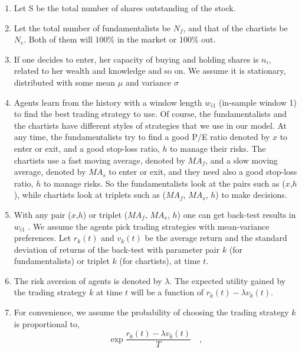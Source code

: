 \begin{enumerate}
\item {Let S be the total number of shares outstanding of the stock.}

\item {Let the total number of fundamentalists be $N_f$, and that of the chartists be $N_c$. Both of them will 100\% in the market or 100\% out.}

\item {If one decides to enter, her capacity of buying and holding shares is $n_i$, related to her wealth and knowledge and so on. We assume it is stationary, distributed with some mean $\mu$ and variance $\sigma$}

\item {Agents learn from the history with a window length $w_{i1}$ (in-sample window 1) to find the best trading strategy to use. Of course, the fundamentalists and the chartists have different styles of strategies that we use in our model.
At any time, the fundamentalists try to find a good P/E ratio denoted by $x$ to enter or exit, and a good stop-loss ratio, $h$ to manage their risks. The chartists use a fast moving average, denoted by $MA_f$, and a slow moving average, denoted by $MA_s$ to enter or exit, and they need also a good stop-loss ratio, $h$ to manage risks. So the fundamentalists look at the pairs such as ($x$,$h$), while chartists look at triplets such as ($MA_f$, $MA_s$, $h$) to make decisions.}

\item {With any pair ($x$,$h$) or triplet ($MA_f$, $MA_s$, $h$) one can get back-test results in $w_{i1}$ . We assume the agents pick trading strategies with mean-variance preferences. Let $r_k(t)$ and $v_k(t)$ be the average return and the standard deviation of returns of the back-test with parameter pair $k$ (for fundamentalists) or triplet $k$ (for chartists), at time $t$. }

\item {The risk aversion of agents is denoted by $\lambda$. The expected utility gained by the trading strategy $k$ at time $t$ will be a function of $r_k (t)-\lambda v_k (t)$.
}

\item {For convenience, we assume the probability of choosing the trading strategy $k$ is proportional to, 
\begin{equation}
\exp{\frac{r_{k}(t)-\lambda v_{k}(t)}{T}} \quad,
\end{equation}

}
\end{enumerate}
